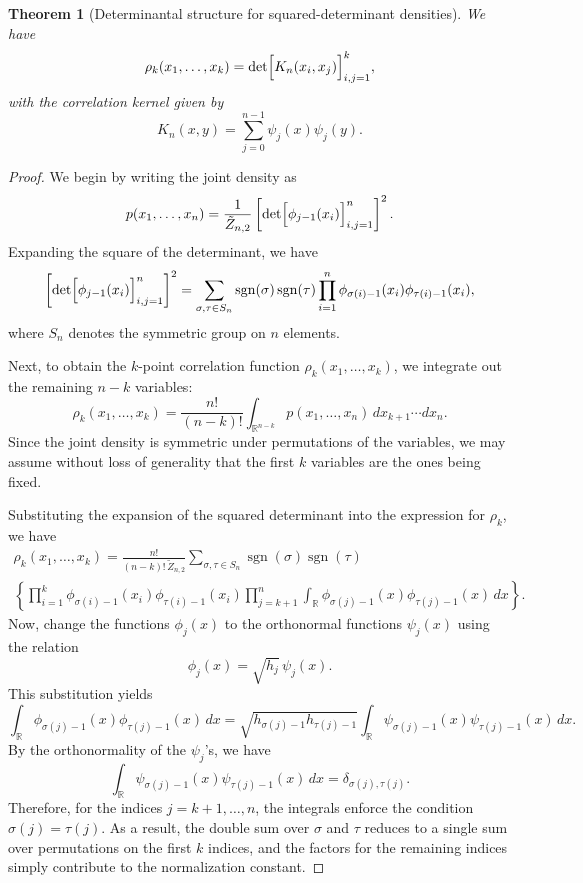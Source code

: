 \documentclass[letterpaper,11pt,oneside,reqno]{article}
\numberwithin{equation}{section}
\newtheorem{theorem}[proposition]{Theorem}
\theoremstyle{definition}
\begin{document}
\begin{theorem}[Determinantal structure for squared-determinant densities]
\label{thm:determinantal}
We have
\[
\rho_k(x_1,\dots,x_k)=\det\Bigl[K_n(x_i,x_j)\Bigr]_{i,j=1}^k,
\]
with the correlation kernel given by
\[
K_n(x,y)=\sum_{j=0}^{n-1}\psi_j(x)\psi_j(y).
\]
\end{theorem}

\begin{proof}
We begin by writing the joint density as
\[
p(x_1,\dots,x_n)=\frac{1}{\tilde{Z}_{n,2}} \left[\det\Bigl[\phi_{j-1}(x_i)\Bigr]_{i,j=1}^n\right]^2.
\]
Expanding the square of the determinant, we have
\[
\left[\det\Bigl[\phi_{j-1}(x_i)\Bigr]_{i,j=1}^n\right]^2 = \sum_{\sigma,\tau\in S_n} \operatorname{sgn}(\sigma)\operatorname{sgn}(\tau) \prod_{i=1}^n \phi_{\sigma(i)-1}(x_i)\phi_{\tau(i)-1}(x_i),
\]
where $S_n$ denotes the symmetric group on $n$ elements.

Next, to obtain the $k$-point correlation function $\rho_k(x_1,\dots,x_k)$, we integrate out the remaining $n-k$ variables:
\[
\rho_k(x_1,\dots,x_k)=\frac{n!}{(n-k)!}\int_{\mathbb{R}^{n-k}} p(x_1,\dots,x_n)\,dx_{k+1}\cdots dx_n.
\]
Since the joint density is symmetric under permutations of the variables, we may assume without loss of generality that the first $k$ variables are the ones being fixed.

Substituting the expansion of the squared determinant into the expression for $\rho_k$, we have
\begin{multline*}
\rho_k(x_1,\dots,x_k)=\frac{n!}{(n-k)!\,\tilde{Z}_{n,2}} \sum_{\sigma,\tau\in S_n} \operatorname{sgn}(\sigma)\operatorname{sgn}(\tau) \\
\left\{ \prod_{i=1}^k \phi_{\sigma(i)-1}(x_i)\phi_{\tau(i)-1}(x_i) \prod_{j=k+1}^n \int_{\mathbb{R}} \phi_{\sigma(j)-1}(x)\phi_{\tau(j)-1}(x)\,dx \right\}.
\end{multline*}
Now, change the functions $\phi_j(x)$ to the orthonormal functions $\psi_j(x)$ using the relation
\[
\phi_j(x)=\sqrt{h_j}\,\psi_j(x).
\]
This substitution yields
\[
\int_{\mathbb{R}} \phi_{\sigma(j)-1}(x)\phi_{\tau(j)-1}(x)\,dx = \sqrt{h_{\sigma(j)-1}h_{\tau(j)-1}} \int_{\mathbb{R}} \psi_{\sigma(j)-1}(x)\psi_{\tau(j)-1}(x)\,dx.
\]
By the orthonormality of the $\psi_j$'s, we have
\[
\int_{\mathbb{R}} \psi_{\sigma(j)-1}(x)\psi_{\tau(j)-1}(x)\,dx = \delta_{\sigma(j),\tau(j)}.
\]
Therefore, for the indices $j=k+1,\dots,n$, the integrals enforce the condition $\sigma(j)=\tau(j)$. As a result, the double sum over $\sigma$ and $\tau$ reduces to a single sum over permutations on the first $k$ indices, and the factors for the remaining indices simply contribute to the normalization constant.


\end{proof}
\end{document}
